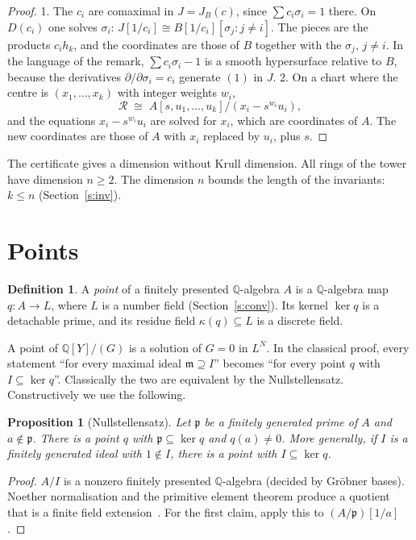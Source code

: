 \documentclass[11pt]{article}
\newcommand{\Q}{\mathbb{Q}}
\newcommand{\p}{\mathfrak{p}}
\newcommand{\m}{\mathfrak{m}}
\newcommand{\cR}{\mathcal{R}}
\numberwithin{equation}{section}
\theoremstyle{plain}
\newtheorem{proposition}[theorem]{Proposition}
\theoremstyle{definition}
\newtheorem{definition}[theorem]{Definition}
\theoremstyle{remark}
\begin{document}
\begin{proof}
1. The $c_i$ are comaximal in $J=J_B(c)$, since $\sum c_i\sigma_i=1$ there. On $D(c_i)$ one solves
$\sigma_i$: $J[1/c_i]\cong B[1/c_i][\sigma_j:j\ne i]$. The pieces are the products $c_ih_k$, and the
coordinates are those of $B$ together with the $\sigma_j$, $j\ne i$. In the language of the remark,
$\sum c_i\sigma_i-1$ is a smooth hypersurface relative to $B$, because the derivatives
$\partial/\partial\sigma_i=c_i$ generate $(1)$ in $J$.
2. On a chart where the centre is $(x_1,\dots,x_k)$ with integer weights $w_i$,
\[
\cR\;\cong\;A[s,u_1,\dots,u_k]\big/(x_i-s^{w_i}u_i),
\]
and the equations $x_i-s^{w_i}u_i$ are solved for $x_i$, which are coordinates of $A$. The new
coordinates are those of $A$ with $x_i$ replaced by $u_i$, plus $s$.
\end{proof}

The certificate gives a dimension without Krull dimension. All rings of the tower have
dimension $n\ge2$. The dimension $n$ bounds the length of the invariants: $k\le n$
(Section~\ref{s:inv}).

\section{Points}\label{s:points}

\begin{definition}
A \emph{point} of a finitely presented $\Q$-algebra $A$ is a $\Q$-algebra map $q:A\to L$, where
$L$ is a number field (Section~\ref{s:conv}). Its kernel $\ker q$ is a detachable prime, and
its residue field $\kappa(q)\subseteq L$ is a discrete field.
\end{definition}

A point of $\Q[Y]/(G)$ is a solution of $G=0$ in $L^N$. In the classical proof, every statement
``for every maximal ideal $\m\supseteq I$'' becomes ``for every point $q$ with $I\subseteq\ker q$''.
Classically the two are equivalent by the Nullstellensatz. Constructively we use the following.

\begin{proposition}[Nullstellensatz]\label{p:null}
Let $\p$ be a finitely generated prime of $A$ and $a\notin\p$. There is a point $q$ with
$\p\subseteq\ker q$ and $q(a)\ne0$. More generally, if $I$ is a finitely generated ideal with
$1\notin I$, there is a point with $I\subseteq\ker q$.
\end{proposition}

\begin{proof}
$A/I$ is a nonzero finitely presented $\Q$-algebra (decided by Gröbner bases). Noether
normalisation and the primitive element theorem produce a quotient that is a finite field
extension~\cite[VII]{LQ}. For the first claim, apply this to $(A/\p)[1/a]$.
\end{proof}
\end{document}
